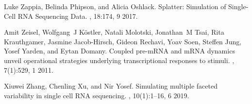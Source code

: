 \documentclass[10pt, a4paper]{article}
\begin{document}
\begin{thebibliography}{10}
	Luke Zappia, Belinda Phipson, and Alicia Oshlack.
	\newblock Splatter: {{Simulation}} of {{Single}}-{{Cell RNA Sequencing Data}}.
	, 18:174, 9 2017.
	
	Amit Zeisel, Wolfgang~J K{\"o}stler, Natali Molotski, Jonathan~M Tsai, Rita
	Krauthgamer, Jasmine Jacob-Hirsch, Gideon Rechavi, Yoav Soen, Steffen Jung,
	Yosef Yarden, and Eytan Domany.
	\newblock Coupled pre-{{mRNA}} and {{mRNA}} dynamics unveil operational
	strategies underlying transcriptional responses to stimuli.
	, 7(1):529, 1 2011.
	
	Xiuwei Zhang, Chenling Xu, and Nir Yosef.
	\newblock Simulating multiple faceted variability in single cell {{RNA}}
	sequencing.
	, 10(1):1--16, 6 2019.
	
\end{thebibliography}
\end{document}
